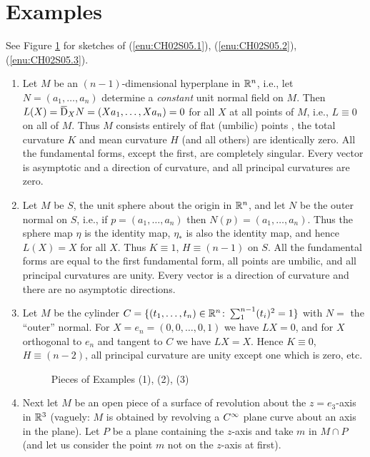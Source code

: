 \documentclass[../main]{subfiles}
\begin{document}
\section{Examples}\label{ch02:s5}

See Figure \ref{fig:ch02fig3} for sketches of (\ref{enu:CH02S05.1}), (\ref{enu:CH02S05.2}), (\ref{enu:CH02S05.3}).

\begin{enumerate}
    \item Let $M$ be an $(n-1)$-dimensional hyperplane in $\mathbb{R}^n$, i.e., let $N = (a_1,\dots,a_n)$ determine a \emph{constant} unit normal field on $M$. Then $L(X) = \covariant_XN = (Xa_1,\dots,Xa_n) = 0$ for all $X$ at all points of $M$, i.e., $L \equiv 0$ on all of $M$. Thus $M$ consists entirely of flat (umbilic) points , the total curvature $K$ and mean curvature $H$ (and all others) are identically zero. All the fundamental forms, except the first, are completely singular. Every vector is asymptotic and a direction of curvature, and all principal curvatures are zero.\label{enu:CH02S05.1}
    \item Let $M$ be $S$, the unit sphere about the origin in $\mathbb{R}^n$, and let $N$ be the outer normal on $S$, i.e., if $p=(a_1,\dots,a_n)$ then $N(p) = (a_1,\dots,a_n)$. Thus the sphere map $\eta$ is the identity map, $\eta_*$ is also the identity map, and hence $L(X) = X$ for all $X$. Thus $K\equiv 1$, $H\equiv (n-1)$ on $S$. All the fundamental forms are equal to the first fundamental form, all points are umbilic, and all principal curvatures are unity. Every vector is a direction of curvature and there are no asymptotic directions. \label{enu:CH02S05.2}
    \item Let $M$ be the cylinder $C = \{(t_1,\dots,t_n)\in\mathbb{R}^n\colon\sum_{1}^{n-1} (t_i)^2 = 1\}$ with $N =$ the ``outer'' normal. For $X = e_n = (0, 0, \dots, 0, 1)$ we have $LX = 0$, and for $X$ orthogonal to $e_n$ and tangent to $C$ we have $LX = X$. Hence $K \equiv 0$, $H\equiv (n-2)$, all principal curvature are unity except one which is zero, etc.\label{enu:CH02S05.3}
    
\begin{figure}[ht]
    \centering
    \caption{Pieces of Examples (1), (2), (3)}
    \label{fig:ch02fig3}
\end{figure}

    
    \item Next let $M$ be an open piece of a surface of revolution about the $z=e_3$-axis in $\mathbb{R}^3$ (vaguely: $M$ is obtained by revolving a $C^\infty$ plane curve about an axis in the plane). Let $P$ be a plane containing the $z$-axis and take $m$ in $M\cap P$ (and let us consider the point $m$ not on the $z$-axis at first). 
    

\end{enumerate}
\end{document}
